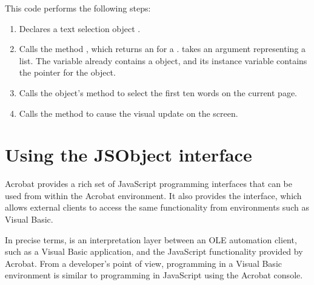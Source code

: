 \documentclass[letterpaper,12pt,english,openany,oneside]{sphinxmanual}
\begin{document}
This code performs the following steps:
\begin{enumerate}
%
\item {} 
Declares a text selection object .

\item {} 
Calls the  method , which returns an  for a .  takes an  argument representing a  list. The  variable already contains a  object, and its instance variable  contains the  pointer for the object.

\item {} 
Calls the  object’s  method to select the first ten words on the current page.

\item {} 
Calls the   method to cause the visual update on the screen.

\end{enumerate}




\section{Using the JSObject interface}
\label{\detokenize{IAC_DevApp_OLE_Support:using-the-jsobject-interface}}
Acrobat provides a rich set of JavaScript programming interfaces that can be used from within the Acrobat environment. It also provides the  interface, which allows external clients to access the same functionality from environments such as Visual Basic.

In precise terms,  is an interpretation layer between an OLE automation client, such as a Visual Basic application, and the JavaScript functionality provided by Acrobat. From a developer’s point of view, programming  in a Visual Basic environment is similar to programming in JavaScript using the Acrobat console.
\end{document}
